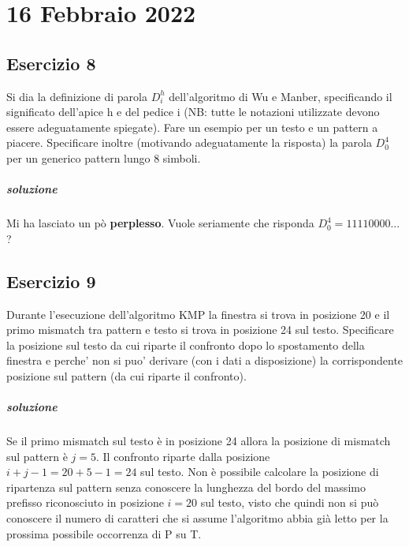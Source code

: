 \chapter{16 Febbraio 2022}

\section{Esercizio 8}

Si dia la definizione di parola $D^h_i$ dell'algoritmo di Wu e Manber, specificando il significato dell'apice h e del pedice i (NB: tutte le notazioni utilizzate devono essere adeguatamente spiegate).
Fare un esempio per un testo e un pattern a piacere. Specificare inoltre (motivando adeguatamente la risposta) la parola $D^4_0$ per un generico pattern lungo 8 simboli.

\paragraph{soluzione} Mi ha lasciato un p\`o \textbf{perplesso}. Vuole seriamente che risponda $D^4_0 = 11110000...$?

\section{Esercizio 9}

Durante l'esecuzione dell'algoritmo KMP la finestra si trova in posizione 20 e il primo mismatch tra pattern e testo si trova in posizione 24 sul testo.
Specificare la posizione sul testo da cui riparte il confronto dopo lo spostamento della finestra e perche' non si puo' derivare (con i dati a disposizione) la corrispondente posizione sul pattern (da cui riparte il confronto).

\paragraph{soluzione}

Se il primo mismatch sul testo \`e in posizione 24 allora la posizione di mismatch sul pattern \`e $j = 5$. Il confronto riparte dalla posizione $i + j - 1 = 20 + 5 - 1 = 24$ sul testo.
Non \`e possibile calcolare la posizione di ripartenza sul pattern senza conoscere la lunghezza del bordo del massimo prefisso riconosciuto in posizione $i = 20$ sul testo, visto che quindi non si pu\`o conoscere il numero di caratteri che si assume l'algoritmo abbia gi\`a letto per la prossima possibile occorrenza di P su T.

